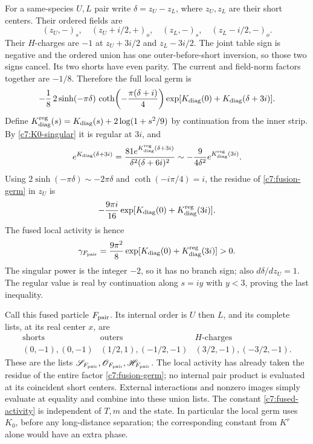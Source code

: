 For a same-species $U,L$ pair write $\delta=z_U-z_L$, where $z_U,z_L$ are
their short centers.  Their ordered fields are
\[
(z_U,-)_{s},\quad(z_U+i/2,+)_{o},\quad
(z_L,-)_{s},\quad(z_L-i/2,-)_{o}.
\]
Their $H$-charges are $-1$ at $z_U+3i/2$ and $z_L-3i/2$.
The joint table sign is negative and the ordered union has one
outer-before-short inversion, so those two signs cancel.  Its two shorts
have even parity.  The current and field-norm factors together are $-1/8$.
Therefore the full local germ is
\begin{equation}\label{c7:fusion-germ}
-\frac18\,2\sinh(-\pi\delta)\,
\coth\!\left(-\frac{\pi(\delta+i)}4\right)
\exp[K_{\rm diag}(0)+K_{\rm diag}(\delta+3i)].
\end{equation}
Define $K_{\rm diag}^{\rm reg}(s)=K_{\rm diag}(s)+2\log(1+s^2/9)$ by continuation from the inner
strip.  By \eqref{c7:K0-singular} it is regular at $3i$, and
\[
e^{K_{\rm diag}(\delta+3i)}
=\frac{81e^{K_{\rm diag}^{\rm reg}(\delta+3i)}}{\delta^2(\delta+6i)^2}
\sim-\frac9{4\delta^2}e^{K_{\rm diag}^{\rm reg}(3i)}.
\]
Using $2\sinh(-\pi\delta)\sim-2\pi\delta$ and
$\coth(-i\pi/4)=i$, the residue of \eqref{c7:fusion-germ} in $z_U$ is
\[
-\frac{9\pi i}{16}\exp[K_{\rm diag}(0)+K_{\rm diag}^{\rm reg}(3i)].
\]
The fused local activity is hence
\begin{equation}\label{c7:fused-activity}
\gamma_{F_{\rm pair}}=\frac{9\pi^2}{8}\exp[K_{\rm diag}(0)+K_{\rm diag}^{\rm reg}(3i)]>0.
\end{equation}
The singular power is the integer $-2$, so it has no branch sign; also
$d\delta/dz_U=1$.  The regular value is real by continuation along $s=iy$
with $y<3$, proving the last inequality.

Call this fused particle $F_{\rm pair}$.  Its internal order is $U$ then
$L$, and its complete lists, at its real center $x$, are
\begin{equation}\label{c7:fused-list}
\begin{array}{c|c|c}
\text{shorts}&\text{outers}&H\text{-charges}\\\hline
(0,-1),(0,-1)&(1/2,1),(-1/2,-1)&(3/2,-1),(-3/2,-1).
\end{array}
\end{equation}
These are the lists $\mathscr S_{F_{\rm pair}},\mathscr O_{F_{\rm pair}},
\mathscr H_{F_{\rm pair}}$.  The local activity has already taken the residue
of the entire factor \eqref{c7:fusion-germ}; no internal pair product is
evaluated at its coincident short centers.
External interactions and nonzero images simply evaluate at equality and
combine into these union lists.  The constant \eqref{c7:fused-activity} is
independent of $T,m$ and the state.  In particular the local germ uses
$K_0$, before any long-distance separation; the corresponding constant
from $K^r$ alone would have an extra phase.

